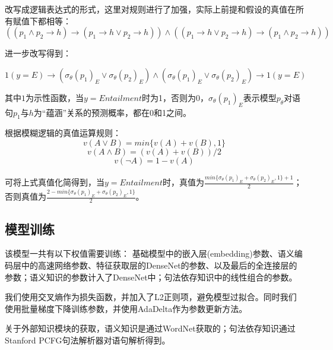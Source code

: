 \documentclass[UTF8,11pt,a4paper,nofonts]{ctexart}
\numberwithin{equation}{section}
\begin{document}
改写成逻辑表达式的形式，这里对规则进行了加强，实际上前提和假设的真值在所有赋值下都相等：
\begin{equation}
 ((p_1 \land p_2 \to h) \to (p_1 \to h \vee p_2 \to h)) \land ((p_1 \to h \vee p_2 \to h) \to (p_1 \land p_2 \to h))
\end{equation}

进一步改写得到：

\begin{equation}
1(y=E) \to (\sigma_\theta(p_1)_E \vee \sigma_\theta(p_2)_E) \land (\sigma_\theta(p_1)_E \vee \sigma_\theta(p_2)_E) \to 1(y=E)
\end{equation}

其中$1$为示性函数，当$y=Entailment$时为1，否则为0，$\sigma_\theta(p_1)_E$表示模型$p_\theta$对语句$p_1$与$h$为“蕴涵”关系的预测概率，都在0和1之间。

根据模糊逻辑的真值运算规则：
\begin{equation}
v(A \vee B) = min\{v(A)+v(B),1\}
\end{equation}
\begin{equation}
v(A \land B) = (v(A) + v(B)) / 2
\end{equation}
\begin{equation}
v(\neg A) = 1 - v(A)
\end{equation}

可将上式真值化简得到，当$y=Entailment$时，真值为$\frac{min\{\sigma_\theta(p_1)_E+\sigma_\theta(p_2)_E,1\}+1}{2}$；否则真值为$\frac{2-min\{\sigma_\theta(p_1)_E+\sigma_\theta(p_2)_E,1\}}{2}$。



\subsection{模型训练}


该模型一共有以下权值需要训练：
基础模型中的嵌入层(embedding)参数、语义编码层中的高速网络参数、特征获取层的DenseNet的参数、以及最后的全连接层的参数；语义知识的参数计入了DenseNet中；句法依存知识中的线性组合的参数。

我们使用交叉熵作为损失函数，并加入了L2正则项，避免模型过拟合。同时我们使用批量梯度下降训练参数，并使用AdaDelta\cite{Zeiler2012ADADELTAAA}作为参数更新方法。

关于外部知识模块的获取，语义知识是通过WordNet获取的；句法依存知识通过Stanford PCFG句法解析器对语句解析得到。
\end{document}
